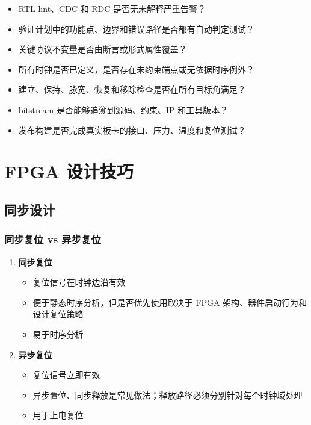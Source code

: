 \begin{itemize}
  \item RTL lint、CDC 和 RDC 是否无未解释严重告警？
  \item 验证计划中的功能点、边界和错误路径是否都有自动判定测试？
  \item 关键协议不变量是否由断言或形式属性覆盖？
  \item 所有时钟是否已定义，是否存在未约束端点或无依据时序例外？
  \item 建立、保持、脉宽、恢复和移除检查是否在所有目标角满足？
  \item bitstream 是否能够追溯到源码、约束、IP 和工具版本？
  \item 发布构建是否完成真实板卡的接口、压力、温度和复位测试？
\end{itemize}

\section{FPGA 设计技巧}

\subsection{同步设计}

\subsubsection{同步复位 vs 异步复位}

\begin{enumerate}
  \item \textbf{同步复位}
    \begin{itemize}
      \item 复位信号在时钟边沿有效
      \item 便于静态时序分析，但是否优先使用取决于 FPGA 架构、器件启动行为和设计复位策略
      \item 易于时序分析
    \end{itemize}

  \item \textbf{异步复位}
    \begin{itemize}
      \item 复位信号立即有效
      \item 异步置位、同步释放是常见做法；释放路径必须分别针对每个时钟域处理
      \item 用于上电复位
    \end{itemize}
\end{enumerate}

